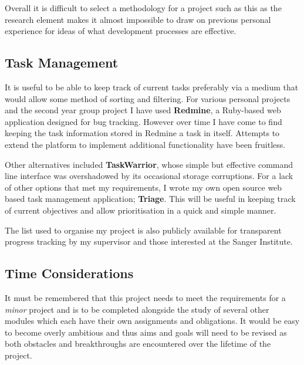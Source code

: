Overall it is difficult to select a methodology for a project such as
this as the research element makes it almost impossible to draw on previous
personal experience for ideas of what development processes are effective.


\subsection{Task Management}

It is useful to be able to keep track of current tasks preferably via a medium
that would allow some method of sorting and filtering. For various personal
projects and the second year group project I have used \textbf{Redmine}, a
Ruby-based web application designed for bug tracking. However over time I have
come to find keeping the task information stored in Redmine a task in itself.
Attempts to extend the platform to implement additional functionality have been
fruitless.

Other alternatives included \textbf{TaskWarrior}, whose simple but effective
command line interface was overshadowed by its occasional storage corruptions.
For a lack of other options that met my requirements, I wrote my own open source
web based task management application; \textbf{Triage}\citep{github:triage}.
This will be useful in keeping track of current objectives and allow
prioritisation in a quick and simple manner.

The list used to organise my project is also publicly available\citep{sam:triage}
for transparent progress tracking by my supervisor and those interested at the
Sanger Institute.


\subsection{Time Considerations}

It must be remembered that this project needs to meet the requirements for a
\textit{minor} project and is to be completed alongside the study of several
other modules which each have their own assignments and obligations. It would be
easy to become overly ambitious and thus aims and goals will need to be revised
as both obstacles and breakthroughs are encountered over the lifetime of the
project.

